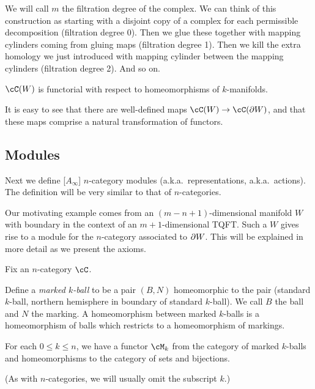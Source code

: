 We will call $m$ the filtration degree of the complex.
We can think of this construction as starting with a disjoint copy of a complex for each
permissible decomposition (filtration degree 0).
Then we glue these together with mapping cylinders coming from gluing maps
(filtration degree 1).
Then we kill the extra homology we just introduced with mapping cylinder between the mapping cylinders (filtration degree 2).
And so on.

$\cC(W)$ is functorial with respect to homeomorphisms of $k$-manifolds.

It is easy to see that
there are well-defined maps $\cC(W)\to\cC(\bd W)$, and that these maps
comprise a natural transformation of functors.




\subsection{Modules}

Next we define [$A_\infty$] $n$-category modules (a.k.a.\ representations,
a.k.a.\ actions).
The definition will be very similar to that of $n$-categories.

Our motivating example comes from an $(m{-}n{+}1)$-dimensional manifold $W$ with boundary
in the context of an $m{+}1$-dimensional TQFT.
Such a $W$ gives rise to a module for the $n$-category associated to $\partial W$.
This will be explained in more detail as we present the axioms.

Fix an $n$-category $\cC$.

Define a {\it marked $k$-ball} to be a pair $(B, N)$ homeomorphic to the pair
(standard $k$-ball, northern hemisphere in boundary of standard $k$-ball).
We call $B$ the ball and $N$ the marking.
A homeomorphism between marked $k$-balls is a homeomorphism of balls which
restricts to a homeomorphism of markings.

{For each $0 \le k \le n$, we have a functor $\cM_k$ from 
the category of marked $k$-balls and 
homeomorphisms to the category of sets and bijections.}

(As with $n$-categories, we will usually omit the subscript $k$.)

